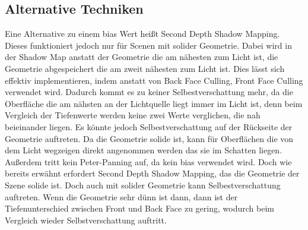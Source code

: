 \subsection{Alternative Techniken}
\label{section:sdsm}
Eine Alternative zu einem bias Wert heißt Second Depth Shadow Mapping.
Dieses funktioniert jedoch nur für Scenen mit solider Geometrie.
Dabei wird in der Shadow Map anstatt der Geometrie die am nähesten zum 
Licht ist, die Geometrie abgespeichert die am zweit nähesten zum Licht ist.
Dies lässt sich effektiv implementieren, indem anstatt von Back Face Culling, Front Face Culling verwendet wird.
Dadurch kommt es zu keiner Selbestverschattung mehr, da die Oberfläche die am nähsten an der 
Lichtquelle liegt immer im Licht ist, denn beim Vergleich der Tiefenwerte werden
keine zwei Werte verglichen, die nah beieinander liegen.
Es könnte jedoch Selbestverschattung auf der Rückseite der Geometrie auftreten.
Da die Geometrie solide ist, kann für Oberflächen die von dem Licht wegzeigen direkt 
angenommen werden das sie im Schatten liegen.
Außerdem tritt kein Peter-Panning auf, da kein bias verwendet wird.
Doch wie bereits erwähnt erfordert Second Depth Shadow Mapping, das die
Geometrie der Szene solide ist.
Doch auch mit solider Geometrie kann Selbestverschattung auftreten.
Wenn die Geometrie sehr dünn ist dann, dann ist der Tiefenunterschied zwischen Front und Back Face zu gering, 
wodurch beim Vergleich wieder Selbstverschattung auftritt.
